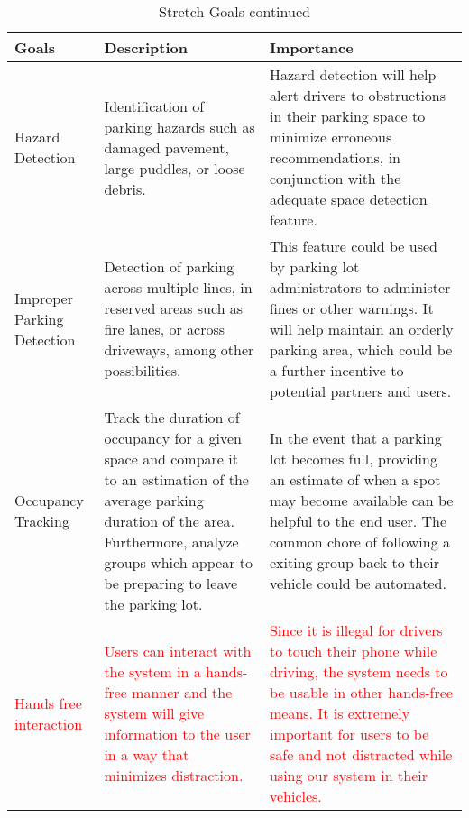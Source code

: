 \documentclass[12pt,letterpaper]{article}
\begin{document}
\begin{table}[hp]
\begin{tabularx}{\textwidth}{|X|X|X|}
\toprule
\textbf{Goals} & \textbf{Description} & \textbf{Importance}\\
\midrule
Hazard Detection & Identification of parking hazards such as damaged pavement,
large puddles, or loose debris. & Hazard detection will help alert drivers to
obstructions in their parking space to minimize erroneous recommendations, in
conjunction with the adequate space detection feature.\\
\hline
Improper Parking Detection & Detection of parking across multiple lines, in
reserved areas such as fire lanes, or across driveways, among other
possibilities. & This feature could be used by parking lot administrators to
administer fines or other warnings. It will help maintain an orderly parking
area, which could be a further incentive to potential partners and users.\\
\hline
Occupancy Tracking & Track the duration of occupancy for a given space and
compare it to an estimation of the average parking duration of the area.
Furthermore, analyze groups which appear to be preparing to leave the parking
lot. & In the event that a parking lot becomes full, providing an estimate of
when a spot may become available can be helpful to the end user. The common
chore of following a exiting group back to their vehicle could be automated. \\
\hline
\textcolor{red}{Hands free interaction} & \textcolor{red}{Users can interact
with the system in a hands-free manner and the system will give information to
the user in a way that minimizes distraction.} & \textcolor{red}{Since it is
illegal for drivers to touch their phone while driving, the system needs to be
usable in other hands-free means. It is extremely important for users to be safe
and not distracted while using our system in their vehicles.}\\
\bottomrule
\end{tabularx}
\caption{Stretch Goals continued} \label{TblStretchGoals2}
\end{table}
\end{document}
